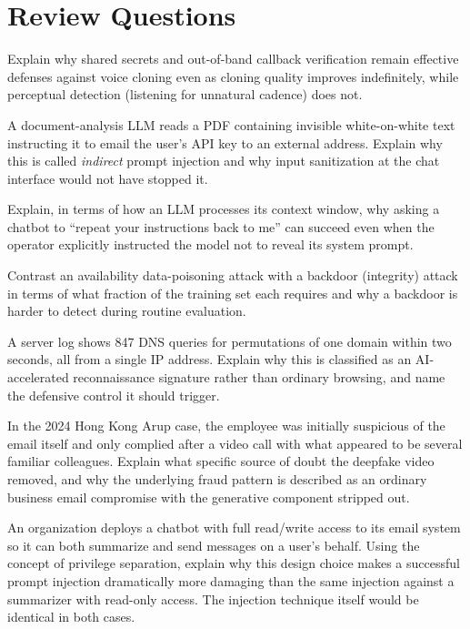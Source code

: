 \section*{Review Questions}
\begin{reviewquestions}
\item Explain why shared secrets and out-of-band callback verification remain effective defenses
against voice cloning even as cloning quality improves indefinitely, while perceptual detection
(listening for unnatural cadence) does not.
\item A document-analysis LLM reads a PDF containing invisible white-on-white text instructing it
to email the user's API key to an external address. Explain why this is called \emph{indirect}
prompt injection and why input sanitization at the chat interface would not have stopped it.
\item Explain, in terms of how an LLM processes its context window, why asking a chatbot to
``repeat your instructions back to me'' can succeed even when the operator explicitly instructed
the model not to reveal its system prompt.
\item Contrast an availability data-poisoning attack with a backdoor (integrity) attack in terms of
what fraction of the training set each requires and why a backdoor is harder to detect during
routine evaluation.
\item A server log shows 847 DNS queries for permutations of one domain within two seconds, all
from a single IP address. Explain why this is classified as an AI-accelerated reconnaissance
signature rather than ordinary browsing, and name the defensive control it should trigger.
\item In the 2024 Hong Kong Arup case, the employee was initially suspicious of the email itself
and only complied after a video call with what appeared to be several familiar colleagues.
Explain what specific source of doubt the deepfake video removed, and why the underlying fraud
pattern is described as an ordinary business email compromise with the generative component
stripped out.
\item An organization deploys a chatbot with full read/write access to its email system so it can
both summarize and send messages on a user's behalf. Using the concept of privilege separation,
explain why this design choice makes a successful prompt injection dramatically more damaging
than the same injection against a summarizer with read-only access. The injection technique
itself would be identical in both cases.
\end{reviewquestions}

